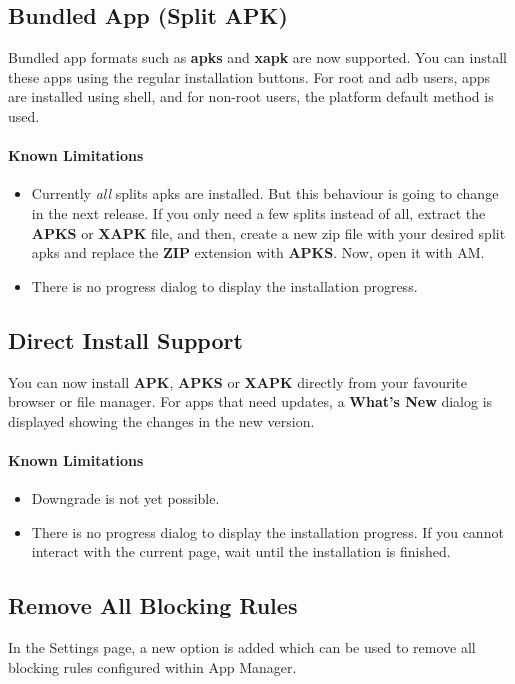 \subsection{Bundled App (Split APK)}
Bundled app formats such as \textbf{apks} and \textbf{xapk} are now supported. You can install these apps using
the regular installation buttons. For root and adb users, apps are installed using shell, and for non-root users,
the platform default method is used.

\paragraph{Known Limitations}
\begin{itemize}
    \item Currently \textit{all} splits apks are installed. But this behaviour is going to change in the next release.
    If you only need a few splits instead of all, extract the \textbf{APKS} or \textbf{XAPK} file, and then, create a new zip
    file with your desired split apks and replace the \textbf{ZIP} extension with \textbf{APKS}. Now, open it with AM\@.
    \item There is no progress dialog to display the installation progress.
\end{itemize}

\subsection{Direct Install Support}
You can now install \textbf{APK}, \textbf{APKS} or \textbf{XAPK} directly from your favourite browser or file manager.
For apps that need updates, a \textbf{What's New} dialog is displayed showing the changes in the new version.

\paragraph{Known Limitations}
\begin{itemize}
    \item Downgrade is not yet possible.
    \item There is no progress dialog to display the installation progress. If you cannot interact with the current page,
    wait until the installation is finished.
\end{itemize}

\subsection{Remove All Blocking Rules}
In the Settings page, a new option is added which can be used to remove all blocking rules configured within App Manager.

